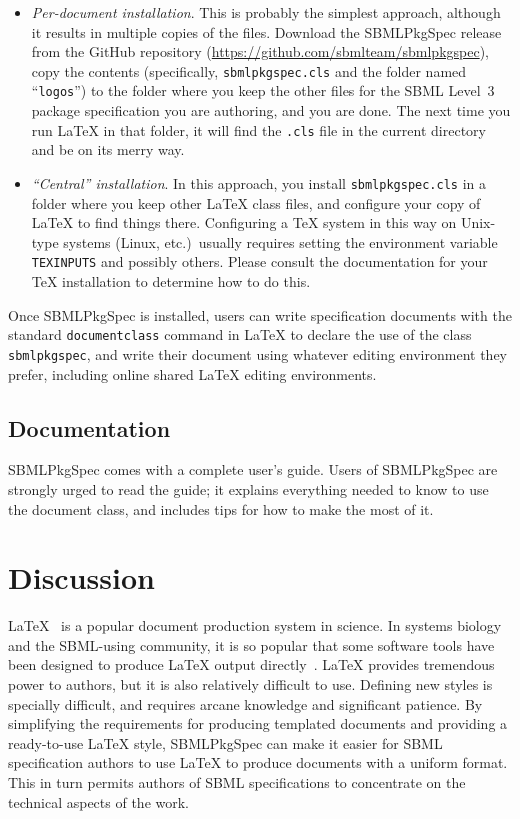 \documentclass{bmcart}
\newcommand{\sbmlpkg}{SBMLPkgSpec}
\newcommand{\sbmlpkgfile}{\texttt{sbmlpkgspec.cls}}
\newcommand{\githuburl}{https://github.com/sbmlteam/sbmlpkgspec}
\begin{document}
\begin{itemize}

\item \emph{Per-document installation}.  This is probably the simplest approach, although it results in multiple copies of the files.  Download the \sbmlpkg{} release from the GitHub repository (\url{\githuburl}), copy the contents (specifically, \sbmlpkgfile{} and the folder named ``\texttt{logos}'') to the folder where you keep the other files for the SBML Level~3 package specification you are authoring, and you are done.  The next time you run LaTeX in that folder, it will find the \texttt{.cls} file in the current directory and be on its merry way.

\item \emph{``Central'' installation}.  In this approach, you install \sbmlpkgfile{} in a folder where you keep other LaTeX class files, and configure your copy of LaTeX to find things there.  Configuring a TeX system in this way on Unix-type systems (Linux, etc.)\ usually requires setting the environment variable \texttt{TEXINPUTS} and possibly others.  Please consult the documentation for your TeX installation to determine how to do this.

\end{itemize}

Once \sbmlpkg{} is installed, users can write specification documents with the standard \texttt{documentclass} command in LaTeX to declare the use of the class \texttt{sbmlpkgspec}, and write their document using whatever editing environment they prefer, including online shared LaTeX editing environments.



\subsection*{Documentation}

\sbmlpkg{} comes with a complete user's guide.  Users of \sbmlpkg{} are strongly urged to read the guide; it explains everything needed to know to use the document class, and includes tips for how to make the most of it.  


\section*{Discussion}

LaTeX~\cite{lamport1994} is a popular document production system in science.  In systems biology and the SBML-using community, it is so popular that some software tools have been designed to produce LaTeX output directly~\cite{drager2009sbml2latex, shen2010sbml2tikz}.  LaTeX provides tremendous power to authors, but it is also relatively difficult to use.  Defining new styles is specially difficult, and requires arcane knowledge and significant patience.  By simplifying the requirements for producing templated documents and providing a ready-to-use LaTeX style, \sbmlpkg{} can make it easier for SBML specification authors to use LaTeX to produce documents with a uniform format.  This in turn permits authors of SBML specifications to concentrate on the technical aspects of the work.
\end{document}
